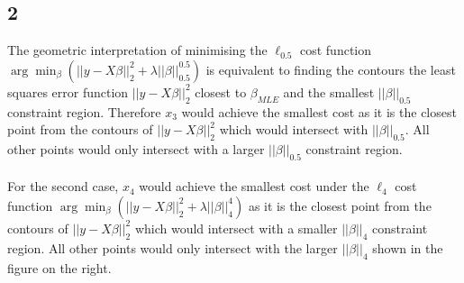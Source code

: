 \documentclass[twoside]{Homework}
\begin{document}
\subsection*{2}
The geometric interpretation of minimising the $\ell_{0.5}$ cost function $\arg \min_{\beta} (||y - X\beta||^2_2 + \lambda ||\beta||_{0.5}^{0.5})$ is equivalent to finding the contours the least squares error function $||y - X\beta||^2_2$ closest to $\beta_{MLE}$ and the smallest $||\beta||_{0.5}$ constraint region. Therefore $x_3$ would achieve the smallest cost as it is the closest point from the contours of $||y - X\beta||^2_2$ which would intersect with $||\beta||_{0.5}$. All other points would only intersect with a larger $||\beta||_{0.5}$ constraint region.\\
\\\noindent
For the second case, $x_4$ would achieve the smallest cost under the $\ell_{4}$ cost function $\arg \min_{\beta} (||y - X\beta||^2_2 + \lambda ||\beta||_{4}^{4})$ as it is the closest point from the contours of $||y - X\beta||^2_2$ which would intersect with a smaller $||\beta||_{4}$ constraint region. All other points would only intersect with the larger $||\beta||_{4}$ shown in the figure on the right.\\

\end{document}
